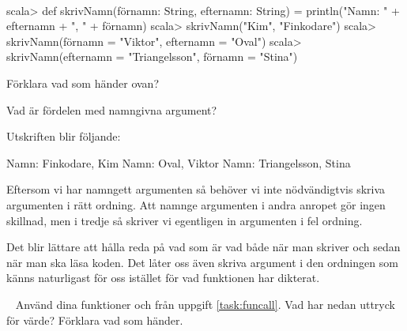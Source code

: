 \Task  \what~
\begin{REPL}
scala> def skrivNamn(förnamn: String, efternamn: String) =
         println("Namn: " + efternamn + ", " + förnamn)
scala> skrivNamn("Kim", "Finkodare")
scala> skrivNamn(förnamn = "Viktor", efternamn = "Oval")
scala> skrivNamn(efternamn = "Triangelsson", förnamn = "Stina")
\end{REPL}

\Subtask Förklara vad som händer ovan?

\Subtask Vad är fördelen med namngivna argument?



\SOLUTION


\TaskSolved \what


\SubtaskSolved
Utskriften blir följande:
\begin{REPLnonum}
Namn: Finkodare, Kim
Namn: Oval, Viktor
Namn: Triangelsson, Stina
\end{REPLnonum}
Eftersom vi har namngett argumenten så behöver vi inte nödvändigtvis skriva argumenten i rätt ordning. Att namnge argumenten i andra anropet gör ingen skillnad, men i tredje så skriver vi egentligen in argumenten i fel ordning.

\SubtaskSolved
Det blir lättare att hålla reda på vad som är vad både när man skriver och sedan när man ska läsa koden. Det låter oss även skriva argument i den ordningen som känns naturligast för oss istället för vad funktionen har dikterat.



\QUESTEND









\QUESTBEGIN

\Task  \what~  Använd dina funktioner  och  från uppgift \ref{task:funcall}. Vad har nedan uttryck för värde? Förklara vad som händer.

\Subtask {}

\Subtask {}

\Subtask {}

\Subtask {}

\Subtask {}

\Subtask {}

